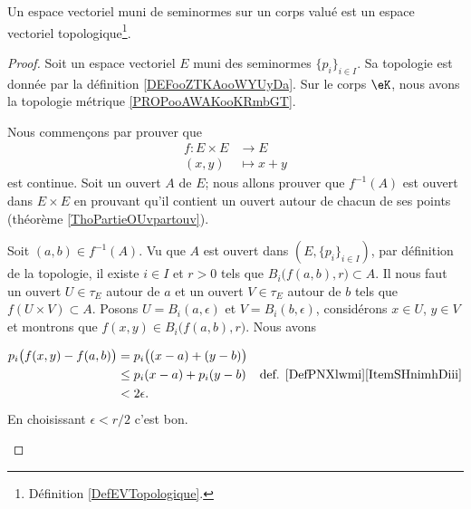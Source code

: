 \begin{proposition}       \label{PROPooGXGQooLRTwvH}
	Un espace vectoriel muni de seminormes sur un corps valué est un espace vectoriel topologique\footnote{Définition \ref{DefEVTopologique}.}.
\end{proposition}

\begin{proof}
	Soit un espace vectoriel \( E\) muni des seminormes \( \{ p_i \}_{i\in I}\). Sa topologie est donnée par la définition \ref{DEFooZTKAooWYUyDa}. Sur le corps \( \eK\), nous avons la topologie métrique \ref{PROPooAWAKooKRmbGT}.
	\begin{subproof}
		\spitem[Somme]

		Nous commençons par prouver que
		\begin{equation}
			\begin{aligned}
				f\colon E\times E & \to E       \\
				(x,y)             & \mapsto x+y
			\end{aligned}
		\end{equation}
		est continue. Soit un ouvert \( A\) de \( E\); nous allons prouver que \( f^{-1}(A)\) est ouvert dans \( E\times E\) en prouvant qu'il contient un ouvert autour de chacun de ses points (théorème \ref{ThoPartieOUvpartouv}).

		Soit \( (a,b)\in f^{-1}(A)\). Vu que \( A\) est ouvert dans \( (E,\{ p_i \}_{i\in I})\), par définition de la topologie, il existe \( i\in I\) et \( r>0\) tels que \( B_i\big( f(a,b),r \big)\subset A\). Il nous faut un ouvert \(U\in \tau_E\) autour de \( a\) et un ouvert \( V\in\tau_E\) autour de \( b\) tels que \( f(U\times V)\subset A\). Posons \( U=B_i(a,\epsilon)\) et \( V=B_i(b,\epsilon)\), considérons \( x\in U\), \( y\in V\) et montrons que \( f(x,y)\in B_i\big( f(a,b),r \big)\). Nous avons

		\begin{subequations}
			\begin{align}
				p_i\big( f(x,y)-f(a,b) \big) & =p_i\big( (x-a)+(y-b) \big)                                                    \\
				                             & \leq p_i(x-a)+p_i(y-b)      & \text{def. \ref{DefPNXlwmi}\ref{ItemSHnimhDiii}} \\
				                             & <2\epsilon.
			\end{align}
		\end{subequations}
		En choisissant \( \epsilon<r/2\) c'est bon.


\end{subproof}
\end{proof}
